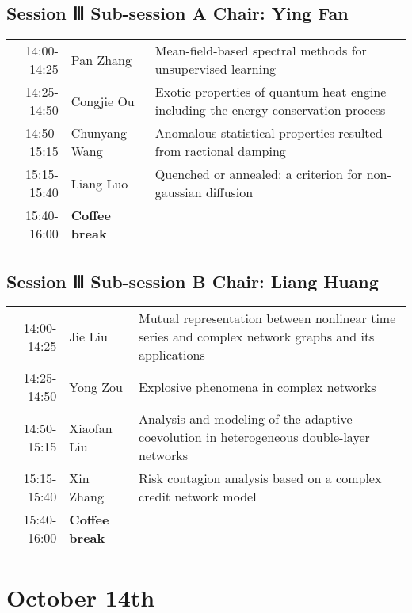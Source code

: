 \documentclass[11pt]{article}
\begin{document}
\subsection*{Session Ⅲ Sub-session A  Chair: Ying Fan}
\label{sec:org026035e}

\begin{center}
\begin{tabular}{rll}
\hline
14:00-14:25 & Pan Zhang & Mean-field-based spectral methods for unsupervised learning\\
14:25-14:50 & Congjie Ou & Exotic properties of quantum heat engine including the energy-conservation process\\
14:50-15:15 & Chunyang Wang & Anomalous statistical properties resulted from ractional damping\\
15:15-15:40 & Liang Luo & Quenched or annealed: a criterion for non-gaussian diffusion\\
 15:40-16:00 &  \textbf{Coffee break} & \\
\hline
\end{tabular}
\end{center}


\subsection*{Session Ⅲ Sub-session B  Chair: Liang Huang}
\label{sec:orgda5a520}

\begin{center}
\begin{tabular}{rll}
\hline
14:00-14:25 & Jie Liu & Mutual representation between nonlinear time series and complex network graphs and its applications\\
14:25-14:50 & Yong Zou & Explosive phenomena in complex networks\\
14:50-15:15 & Xiaofan Liu & Analysis and modeling of the adaptive coevolution in heterogeneous double-layer networks\\
15:15-15:40 & Xin Zhang & Risk contagion analysis based on a complex credit network model\\
 15:40-16:00 &  \textbf{Coffee break} & \\
\hline
\end{tabular}
\end{center}

\newpage

\section*{October 14th}
\label{sec:org53d2390}
\end{document}
